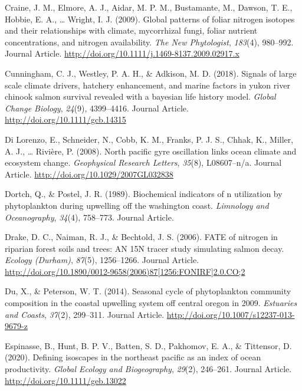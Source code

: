 \documentclass [11pt, proquest] {uwthesis}[2015/03/03]
\begin{document}
\hypertarget{ref-Craine2009}{}
Craine, J. M., Elmore, A. J., Aidar, M. P. M., Bustamante, M., Dawson,
T. E., Hobbie, E. A., \ldots{} Wright, I. J. (2009). Global patterns of
foliar nitrogen isotopes and their relationships with climate,
mycorrhizal fungi, foliar nutrient concentrations, and nitrogen
availability. \emph{The New Phytologist}, \emph{183}(4), 980--992.
Journal Article. \url{http://doi.org/10.1111/j.1469-8137.2009.02917.x}

\hypertarget{ref-Cunningham2018}{}
Cunningham, C. J., Westley, P. A. H., \& Adkison, M. D. (2018). Signals
of large scale climate drivers, hatchery enhancement, and marine factors
in yukon river chinook salmon survival revealed with a bayesian life
history model. \emph{Global Change Biology}, \emph{24}(9), 4399--4416.
Journal Article. \url{http://doi.org/10.1111/gcb.14315}

\hypertarget{ref-DiLorenzo2008}{}
Di Lorenzo, E., Schneider, N., Cobb, K. M., Franks, P. J. S., Chhak, K.,
Miller, A. J., \ldots{} Rivière, P. (2008). North pacific gyre
oscillation links ocean climate and ecosystem change. \emph{Geophysical
Research Letters}, \emph{35}(8), L08607--n/a. Journal Article.
\url{http://doi.org/10.1029/2007GL032838}

\hypertarget{ref-Dortch1989}{}
Dortch, Q., \& Postel, J. R. (1989). Biochemical indicators of n
utilization by phytoplankton during upwelling off the washington coast.
\emph{Limnology and Oceanography}, \emph{34}(4), 758--773. Journal
Article.

\hypertarget{ref-Drake2006}{}
Drake, D. C., Naiman, R. J., \& Bechtold, J. S. (2006). FATE of nitrogen
in riparian forest soils and trees: AN 15N tracer study simulating
salmon decay. \emph{Ecology (Durham)}, \emph{87}(5), 1256--1266. Journal
Article.
\href{http://doi.org/10.1890/0012-9658(2006)87\%5B1256:FONIRF\%5D2.0.CO;2}{http://doi.org/10.1890/0012-9658(2006)87{[}1256:FONIRF{]}2.0.CO;2}

\hypertarget{ref-Du2014}{}
Du, X., \& Peterson, W. T. (2014). Seasonal cycle of phytoplankton
community composition in the coastal upwelling system off central oregon
in 2009. \emph{Estuaries and Coasts}, \emph{37}(2), 299--311. Journal
Article. \url{http://doi.org/10.1007/s12237-013-9679-z}

\hypertarget{ref-Espinasse2020}{}
Espinasse, B., Hunt, B. P. V., Batten, S. D., Pakhomov, E. A., \&
Tittensor, D. (2020). Defining isoscapes in the northeast pacific as an
index of ocean productivity. \emph{Global Ecology and Biogeography},
\emph{29}(2), 246--261. Journal Article.
\url{http://doi.org/10.1111/geb.13022}
\end{document}
